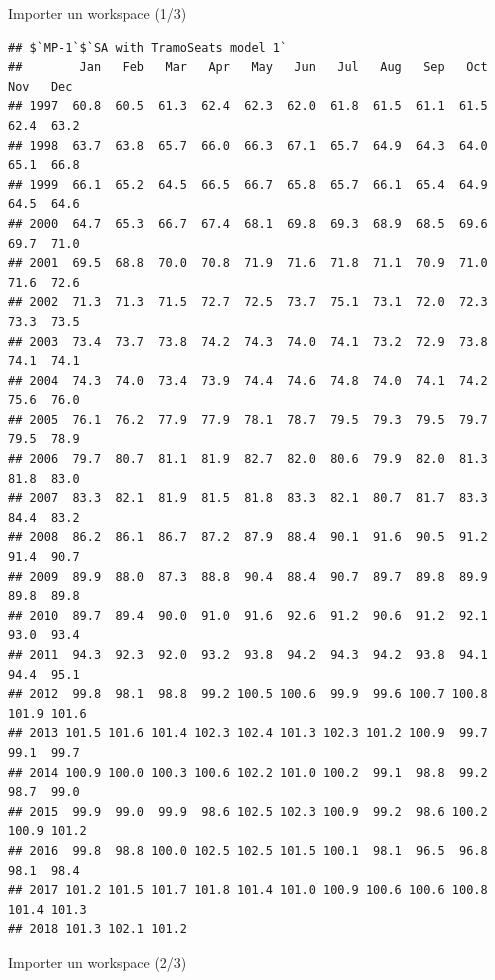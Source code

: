 \documentclass[10pt,xcolor=table,color={dvipsnames,usenames},ignorenonframetext,usepdftitle=false,french]{beamer}
\begin{document}
\begin{frame}[fragile]{Importer un workspace (1/3)}
\begin{verbatim}
## $`MP-1`$`SA with TramoSeats model 1`
##        Jan   Feb   Mar   Apr   May   Jun   Jul   Aug   Sep   Oct   Nov   Dec
## 1997  60.8  60.5  61.3  62.4  62.3  62.0  61.8  61.5  61.1  61.5  62.4  63.2
## 1998  63.7  63.8  65.7  66.0  66.3  67.1  65.7  64.9  64.3  64.0  65.1  66.8
## 1999  66.1  65.2  64.5  66.5  66.7  65.8  65.7  66.1  65.4  64.9  64.5  64.6
## 2000  64.7  65.3  66.7  67.4  68.1  69.8  69.3  68.9  68.5  69.6  69.7  71.0
## 2001  69.5  68.8  70.0  70.8  71.9  71.6  71.8  71.1  70.9  71.0  71.6  72.6
## 2002  71.3  71.3  71.5  72.7  72.5  73.7  75.1  73.1  72.0  72.3  73.3  73.5
## 2003  73.4  73.7  73.8  74.2  74.3  74.0  74.1  73.2  72.9  73.8  74.1  74.1
## 2004  74.3  74.0  73.4  73.9  74.4  74.6  74.8  74.0  74.1  74.2  75.6  76.0
## 2005  76.1  76.2  77.9  77.9  78.1  78.7  79.5  79.3  79.5  79.7  79.5  78.9
## 2006  79.7  80.7  81.1  81.9  82.7  82.0  80.6  79.9  82.0  81.3  81.8  83.0
## 2007  83.3  82.1  81.9  81.5  81.8  83.3  82.1  80.7  81.7  83.3  84.4  83.2
## 2008  86.2  86.1  86.7  87.2  87.9  88.4  90.1  91.6  90.5  91.2  91.4  90.7
## 2009  89.9  88.0  87.3  88.8  90.4  88.4  90.7  89.7  89.8  89.9  89.8  89.8
## 2010  89.7  89.4  90.0  91.0  91.6  92.6  91.2  90.6  91.2  92.1  93.0  93.4
## 2011  94.3  92.3  92.0  93.2  93.8  94.2  94.3  94.2  93.8  94.1  94.4  95.1
## 2012  99.8  98.1  98.8  99.2 100.5 100.6  99.9  99.6 100.7 100.8 101.9 101.6
## 2013 101.5 101.6 101.4 102.3 102.4 101.3 102.3 101.2 100.9  99.7  99.1  99.7
## 2014 100.9 100.0 100.3 100.6 102.2 101.0 100.2  99.1  98.8  99.2  98.7  99.0
## 2015  99.9  99.0  99.9  98.6 102.5 102.3 100.9  99.2  98.6 100.2 100.9 101.2
## 2016  99.8  98.8 100.0 102.5 102.5 101.5 100.1  98.1  96.5  96.8  98.1  98.4
## 2017 101.2 101.5 101.7 101.8 101.4 101.0 100.9 100.6 100.6 100.8 101.4 101.3
## 2018 101.3 102.1 101.2
\end{verbatim}

\end{frame}

\begin{frame}{Importer un workspace (2/3)}
\protect\hypertarget{importer-un-workspace-23}{}


\end{frame}
\end{document}
